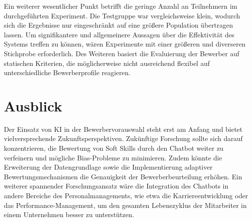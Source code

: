 Ein weiterer wesentlicher Punkt betrifft die geringe Anzahl an Teilnehmern im durchgeführten Experiment. Die Testgruppe war vergleichsweise klein, wodurch sich die Ergebnisse nur eingeschränkt auf eine größere Population übertragen lassen. Um signifikantere und allgemeinere Aussagen über die Effektivität des Systems treffen zu können, wären Experimente mit einer größeren und diverseren Stichprobe erforderlich. Des Weiteren basiert die Evaluierung der Bewerber auf statischen Kriterien, die möglicherweise nicht ausreichend flexibel auf unterschiedliche Bewerberprofile reagieren.

\section{Ausblick}

Der Einsatz von KI in der Bewerbervorauswahl steht erst am Anfang und bietet vielversprechende Zukunftsperspektiven. Zukünftige Forschung sollte sich darauf konzentrieren, die Bewertung von Soft Skills durch den Chatbot weiter zu verfeinern und mögliche Bias-Probleme zu minimieren. Zudem könnte die Erweiterung der Datengrundlage sowie die Implementierung adaptiver Bewertungsmechanismen die Genauigkeit der Bewerberbeurteilung erhöhen. Ein weiterer spannender Forschungsansatz wäre die Integration des Chatbots in andere Bereiche des Personalmanagements, wie etwa die Karriereentwicklung oder das Performance-Management, um den gesamten Lebenszyklus der Mitarbeiter in einem Unternehmen besser zu unterstützen.